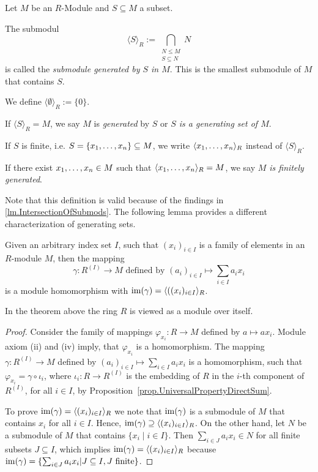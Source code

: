 \begin{defin}
Let $M$ be an $R$-Module and $S\subseteq M$ a subset.
\begin{thmlist}
\item The submodul \begin{equation*}
\langle S \rangle_R := \bigcap\limits_{\substack{N\leq M\\S\subseteq N}}N
\end{equation*}  is called the \emph{submodule generated by $S$ in $M$}. This is the smallest submodule of $M$ that contains $S$.
\item We define $\langle\emptyset\rangle_R:=\lbrace 0\rbrace$.
\item If $\langle S \rangle_R=M$, we say $M$ is \emph{generated} by $S$ or \emph{$S$ is a generating set of $M$}.
\item If $S$ is finite, i.e. $S=\lbrace x_{1},\ldots,x_{n}\rbrace\subseteq M$, we write $\langle x_{1},\ldots,x_{n}\rangle_R$ instead of $\langle S \rangle_R$.
\item If there exist $x_{1},\ldots,x_{n}\in M$ such that $\langle x_{1},\ldots,x_{n}\rangle_R=M$, we say \emph{$M$ is finitely generated}.
\end{thmlist}
\end{defin}
Note that this definition is valid because of the findings in \cref{lm.IntersectionOfSubmods}. The following lemma provides a different characterization of generating sets.

\begin{thm}\label{lem.Generating Set Homomorphism}
Given an arbitrary index set $I$, such that $(x_i)_{i\in I}$ is a family of elements in an $R$-module $M$, then the mapping
\begin{equation*}
\gamma\colon R^{(I)}\to M \text{ defined by } (a_i)_{i\in I}\mapsto \sum_{i\in I} a_i x_i
\end{equation*}
is a module homomorphism with $\operatorname{im}(\gamma)=\langle ((x_i)_{i\in I}\rangle_R$.
\end{thm}
In the theorem above the ring $R$ is viewed as a module over itself.
\begin{proof}
Consider the family of mappings $\varphi_{x_i}\colon R\to M$ defined by $a\mapsto ax_i$. Module axiom (ii) and (iv) imply, that $\varphi_{x_i}$ is a homomorphism. The mapping $\gamma\colon R^{(I)}\to M$ defined by $(a_i)_{i\in I}\mapsto\sum_{i\in I} a_ix_i$ is a homomorphism, such that $\varphi_{x_i}=\gamma\circ\iota_i$, where $\iota_i\colon R\to R^{(I)}$ is the embedding of $R$ in the $i$-th component of $R^{(I)}$, for all $i\in I$, by Proposition~\ref{prop.UniversalPropertyDirectSum}.

To prove $\operatorname{im}(\gamma)=\langle (x_i)_{i\in I}\rangle_R$ we note that $\operatorname{im}(\gamma)$ is a submodule of $M$ that contains $x_i$ for all $i\in I$. Hence, $\operatorname{im}(\gamma)\supseteq\langle (x_i)_{i\in I}\rangle_R$. On the other hand, let $N$ be a submodule of $M$ that contains $\lbrace x_i\mid i\in I\rbrace$. Then $\sum_{i\in J} a_i x_i\in N$ for all finite subsets $J\subseteq I$, which implies $\operatorname{im}(\gamma)=\langle (x_i)_{i\in I}\rangle_R$ because $\operatorname{im}(\gamma)=\lbrace\sum_{i\in J} a_i x_i| J\subseteq I, J \text{ finite}\rbrace$.
\end{proof}

